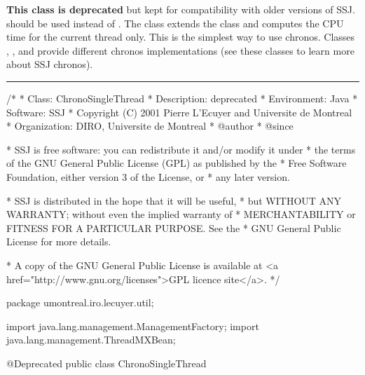 
\textbf{This class is deprecated} but kept for
compatibility with older versions of SSJ.
 should be used instead of .
The  class extends the  
class and computes the CPU time for the current thread only.
This is the simplest way to use chronos. Classes ,
,  and 
 provide different chronos implementations
(see these classes to learn more about SSJ chronos).


\bigskip\hrule

\begin{code}
\begin{hide}
/*
 * Class:        ChronoSingleThread
 * Description:  deprecated
 * Environment:  Java
 * Software:     SSJ 
 * Copyright (C) 2001  Pierre L'Ecuyer and Universite de Montreal
 * Organization: DIRO, Universite de Montreal
 * @author       
 * @since

 * SSJ is free software: you can redistribute it and/or modify it under
 * the terms of the GNU General Public License (GPL) as published by the
 * Free Software Foundation, either version 3 of the License, or
 * any later version.

 * SSJ is distributed in the hope that it will be useful,
 * but WITHOUT ANY WARRANTY; without even the implied warranty of
 * MERCHANTABILITY or FITNESS FOR A PARTICULAR PURPOSE.  See the
 * GNU General Public License for more details.

 * A copy of the GNU General Public License is available at
   <a href="http://www.gnu.org/licenses">GPL licence site</a>.
 */
\end{hide}
package umontreal.iro.lecuyer.util;\begin{hide}

import java.lang.management.ManagementFactory;
import java.lang.management.ThreadMXBean;
\end{hide}


@Deprecated
public class ChronoSingleThread \begin{hide} extends AbstractChrono {

   private ThreadCPUTimeChrono chrono = new ThreadCPUTimeChrono();

   protected void getTime (long[] tab) {
         chrono.getTime(tab);
   }\end{hide}
\end{code}

